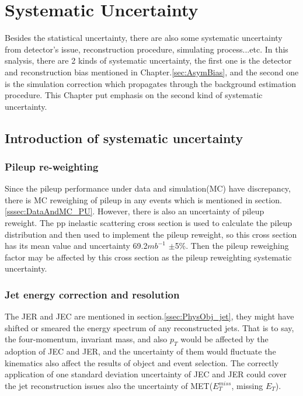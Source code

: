 

\section{    Systematic Uncertainty}
\label{sec:Systematic}

	Besides the statistical uncertainty, there are also some systematic uncertainty from detector's issue, reconstruction procedure, simulating process...etc. In this snalysis, there are 2 kinds of systematic uncertainty, the first one is the detector and reconstruction bias mentioned in Chapter.\ref{sec:AsymBias}, and the second one is the simulation correction which propagates through the background estimation procedure. This Chapter put emphasis on the second kind of systematic uncertainty.

	\subsection{   Introduction of systematic uncertainty}
	\label{ssec:Syst_type}
		\subsubsection{Pileup re-weighting}
		\label{sssec:Syst_PU}


			Since the pileup performance under data and simulation(MC) have discrepancy, there is MC reweighing of pileup in any events which is mentioned in section.\ref{sssec:DataAndMC_PU}. However, there is also an uncertainty of pileup reweight. The pp inelastic scattering cross section is used to calculate the pileup distribution and then used to implement the pileup reweight, so this cross section has its mean value and uncertainty 69.2$mb^{-1}$ $\pm$5\%. Then the pileup reweighing factor may be affected by this cross section as the pileup reweighting systematic uncertainty.

		\subsubsection{   Jet energy correction and resolution}
		\label{sssec:Syst_JECJER}

			The JER and JEC are mentioned in section.\ref{ssec:PhysObj_jet}, they might have shifted or smeared the energy spectrum of any reconstructed jets. That is to say, the four-momentum, invariant mass, and also $p_T$ would be affected by the adoption of JEC and JER, and the uncertainty of them would fluctuate the kinematics also affect the results of object and event selection. The correctly application of one standard deviation uncertainty of JEC and JER could cover the jet reconstruction issues also the uncertainty of MET($E_T^{miss}$, missing $E_T$).
			


